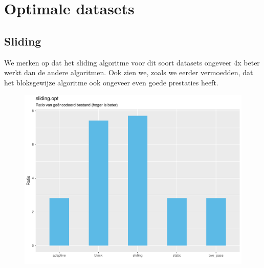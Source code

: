 \documentclass[a4paper,12pt]{report}
\begin{document}
\section{Optimale datasets}
\subsection{Sliding}
We merken op dat het sliding algoritme voor dit soort datasets ongeveer 4x beter werkt dan de andere algoritmen. Ook zien we, zoals we eerder vermoedden, dat het bloksgewijze algoritme ook ongeveer even goede prestaties heeft.
\begin{figure}[H]
	\includegraphics[scale=0.8]{../experimenten/grafieken/sliding_opt}
\end{figure}
\end{document}
